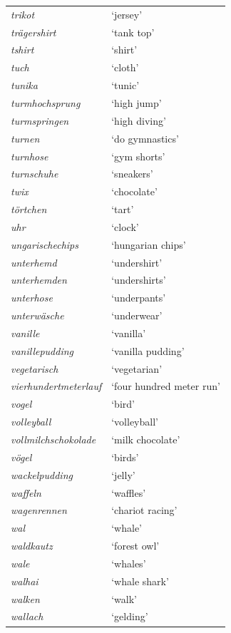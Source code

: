 \begin{longtable}{ll}
\textit{trikot} & `jersey' \\
\textit{trägershirt} & `tank top' \\
\textit{tshirt} & `shirt' \\
\textit{tuch} & `cloth' \\
\textit{tunika} & `tunic' \\
\textit{turmhochsprung} & `high jump' \\
\textit{turmspringen} & `high diving' \\
\textit{turnen} & `do gymnastics' \\
\textit{turnhose} & `gym shorts' \\
\textit{turnschuhe} & `sneakers' \\
\textit{twix} & `chocolate' \\
\textit{törtchen} & `tart' \\
\textit{uhr} & `clock' \\
\textit{ungarischechips} & `hungarian chips' \\
\textit{unterhemd} & `undershirt' \\
\textit{unterhemden} & `undershirts' \\
\textit{unterhose} & `underpants' \\
\textit{unterwäsche} & `underwear' \\
\textit{vanille} & `vanilla' \\
\textit{vanillepudding} & `vanilla pudding' \\
\textit{vegetarisch} & `vegetarian' \\
\textit{vierhundertmeterlauf} & `four hundred meter run' \\
\textit{vogel} & `bird' \\
\textit{volleyball} & `volleyball' \\
\textit{vollmilchschokolade} & `milk chocolate' \\
\textit{vögel} & `birds' \\
\textit{wackelpudding} & `jelly' \\
\textit{waffeln} & `waffles' \\
\textit{wagenrennen} & `chariot racing' \\
\textit{wal} & `whale' \\
\textit{waldkautz} & `forest owl' \\
\textit{wale} & `whales' \\
\textit{walhai} & `whale shark' \\
\textit{walken} & `walk' \\
\textit{wallach} & `gelding' \\

\end{longtable}
